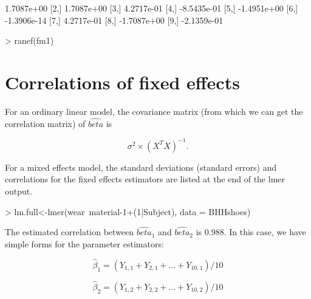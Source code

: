 \documentclass[12pt]{amsart}
\begin{document}
\begin{Schunk}
\begin{Sinput}
\end{Sinput}
\begin{Soutput}
             [,1]
 [1,]  1.7087e+00
 [2,]  1.7087e+00
 [3,]  4.2717e-01
 [4,] -8.5435e-01
 [5,] -1.4951e+00
 [6,] -1.3906e-14
 [7,]  4.2717e-01
 [8,] -1.7087e+00
 [9,] -2.1359e-01
\end{Soutput}
\begin{Sinput}
> ranef(fm1)
\end{Sinput}
\end{Schunk}

\section{Correlations of fixed effects}

For an ordinary linear model, the covariance matrix (from which we can get the correlation matrix) of $$ is

\begin{equation}
\sigma^2 \times (X^T X)^{-1}.
\end{equation}

For a mixed effects model, the standard deviations (standard errors) and correlations for the fixed effects estimators are listed at the end of the lmer output. 

\begin{Schunk}
\begin{Sinput}
> lm.full<-lmer(wear~material-1+(1|Subject), data = BHHshoes)
\end{Sinput}
\end{Schunk}

The estimated correlation between $_1$ and $_2$ is $0.988$.
In this case, we have simple forms for the parameter estimators:

\begin{equation}
\hat{\beta}_1 = (Y_{1,1} + Y_{2,1} + \dots + Y_{10,1})/10
\end{equation}


\begin{equation}
\hat{\beta}_2 = (Y_{1,2} + Y_{2,2} + \dots + Y_{10,2})/10
\end{equation}
\end{document}
